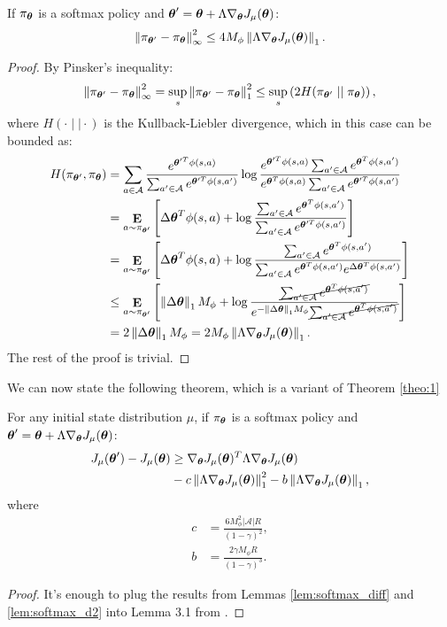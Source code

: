 \begin{lemma}\label{lem:softmax_infnorm}
If $\pi_{\vtheta}$ is a softmax policy and $\vtheta' = \vtheta+\Lambda\gradJ{\vtheta}$:
\[
	\norm[\infty]{\pi_{\vtheta'} - \pi_{\vtheta}}^2 \leq 4M_\phi\norm[1]{\Lambda\gradJ{\vtheta}}.
\]
\end{lemma}
\begin{proof}
By Pinsker's inequality:
\begin{align*}
\norm[\infty]{\pi_{\vtheta'} - \pi_{\vtheta}}^2 = \sup_s\norm[1]{\pi_{\vtheta'} - \pi_{\vtheta}}^2 \leq \sup_s\left(2H(\pi_{\vtheta'}\mid\mid\pi_{\vtheta})\right),
\end{align*}
where $H(\cdot\mid\mid\cdot)$ is the Kullback-Liebler divergence, which in this case can be bounded as:
\begin{align*}
H(\pi_{\vtheta'},\pi_{\vtheta}) &= 
\sum_{a \in \mathcal{A}}
	\frac{e^{\vtheta'^T\phi(s,a)}}{\sum_{a'\in\mathcal{A}}e^{\vtheta'^T\phi(s,a')}}
	\log\frac{e^{\vtheta'^T\phi(s,a)}\sum_{a'\in\mathcal{A}}e^{\vtheta^T\phi(s,a')}}
	{e^{\vtheta^T\phi(s,a)}\sum_{a'\in\mathcal{A}}e^{\vtheta'^T\phi(s,a')}} \\
	&= \expected{a}{\pi_{\vtheta'}}{
	\Delta\vtheta^T\phi(s,a) + \log\frac{\sum_{a'\in\mathcal{A}}e^{\vtheta^T\phi(s,a')}}
	{\sum_{a'\in\mathcal{A}}e^{\vtheta'^T\phi(s,a')}}} \\
	&= \expected{a}{\pi_{\vtheta'}}{
	\Delta\vtheta^T\phi(s,a) + \log\frac{\sum_{a'\in\mathcal{A}}e^{\vtheta^T\phi(s,a')}}		{\sum_{a'\in\mathcal{A}}e^{\vtheta^T\phi(s,a')}e^{\Delta\vtheta^T\phi(s,a')}}} \\
	&\leq \expected{a}{\pi_{\vtheta'}}{
	\norm[1]{\Delta\vtheta}M_\phi + \log\frac{\cancel{\sum_{a'\in\mathcal{A}}e^{\vtheta^T\phi(s,a')}}}
	{e^{-\norm[1]{\Delta\vtheta}M_\phi}\cancel{\sum_{a'\in\mathcal{A}}e^{\vtheta^T\phi(s,a')}}}} \\
	&= 2\norm[1]{\Delta\vtheta}M_\phi = 2M_\phi\norm[1]{\Lambda\gradJ{\vtheta}}. 	
\end{align*}
The rest of the proof is trivial.
\end{proof}

We can now state the following theorem, which is a variant of Theorem \ref{theo:1}

\begin{theorem}\label{theo:softmax1}
For any initial state distribution $\mu$, if $\pi_{\vtheta}$ is a softmax policy and $\vtheta' = \vtheta+\Lambda\gradJ{\vtheta}$:
\begin{align*}
\DeltaJ &\geq \gradJ{\vtheta}^T\Lambda\gradJ{\vtheta} \\
	&-c\norm[1]{\Lambda\gradJ{\vtheta}}^2 -
	b\norm[1]{\Lambda\gradJ{\vtheta}},
\end{align*}
where
\begin{align*}
c &= \frac{6M_{\phi}^2|\mathcal{A}|R}{(1-\gamma)^2}, \\
b &=  \frac{2\gamma M_{\phi}R}{(1-\gamma)^3}.
\end{align*}
\end{theorem}
\begin{proof}
It's enough to plug the results from Lemmas \ref{lem:softmax_diff} and \ref{lem:softmax_d2} into Lemma 3.1 from \cite{NIPS2013_5186}.
\end{proof}

